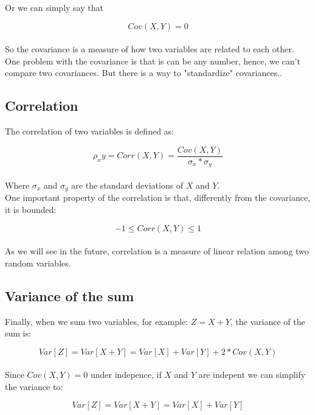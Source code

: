 \documentclass[11pt]{article}
\begin{document}
	Or we can simply say that

	\[Cov(X,Y) = 0\]\\

	So the covariance is a measure of how two variables are related to each other. One problem with the covariance is that is can be any number, hence, we can't compare two covariances. But there is a way to "standardize" covariances..

	\subsection*{Correlation}

	The correlation of two variables is defined as:

	\[\rho_xy = Corr(X,Y) = \frac{Cov(X,Y)}{\sigma_x*\sigma_y} \]\\

	Where $\sigma_x$ and $\sigma_y$ are the standard deviations of $X$ and $Y$.\\

	One important property of the correlation is that, differently from the covariance, it is bounded:

	\[ -1 \leq Corr(X,Y) \leq 1\]\\

	As we will see in the future, correlation is a measure of linear relation among two random variables.

	\subsection*{Variance of the sum}

	Finally, when we sum two variables, for example: $Z=X+Y$, the variance of the sum is:

	\[Var[Z] = Var[X+Y] = Var[X] + Var[Y] + 2*Cov(X,Y)\]\\

	Since $Cov(X,Y) = 0$ under indepence, if $X$ and $Y$ are indepent we can simplify the variance to:

	\[Var[Z] = Var[X+Y] = Var[X] + Var[Y]\]
\end{document}
